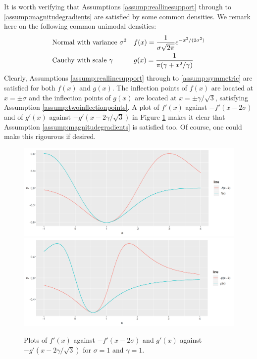 		
		It is worth verifying that Assumptions \ref{assump:reallinesupport} through to \ref{assump:magnitudegradients} are satisfied by some common densities. 
		We remark here on the following common unimodal densities:
		\begin{align}
			&\text{Normal with variance $\sigma^2$} && f(x) = \frac{1}{\sigma\sqrt{2\pi}} e^{-x^2/(2\sigma^2)}\\
			&\text{Cauchy with scale $\gamma$} && g(x) = \frac{1}{\pi (\gamma + x^2/\gamma)}
		\end{align}
		Clearly, Assumptions \ref{assump:reallinesupport} through to \ref{assump:symmetric} are satisfied for both $f(x)$ and $g(x)$.
		The inflection points of $f(x)$ are located at $x = \pm \sigma$ and the inflection points of $g(x)$ are located at $x = \pm \gamma/\sqrt{3}$, satisfying Assumption \ref{assump:twoinflectionpoints}. A plot of $f'(x)$ against $-f'(x - 2\sigma)$ and of $g'(x)$ against $-g'(x - 2\gamma/\sqrt{3})$ in Figure \ref{fig:assumption6} makes it clear that Assumption \ref{assump:magnitudegradients} is satisfied too. Of course, one could make this rigourous if desired.

		\begin{figure}
			\centering
			\includegraphics[width = \textwidth]{Figures/Mixtures/assumption6_normal.png}
			\includegraphics[width = \textwidth]{Figures/Mixtures/assumption6_cauchy.png}
			\caption{Plots of $f'(x)$ against $-f'(x - 2\sigma)$ and $g'(x)$ against $-g'(x - 2\gamma/\sqrt{3})$ for $\sigma = 1$ and $\gamma = 1$.}
			\label{fig:assumption6}
		\end{figure}

